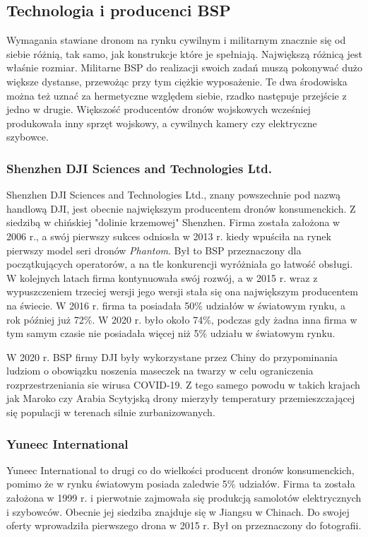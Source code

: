 \subsection{Technologia i producenci BSP}
Wymagania stawiane dronom na rynku cywilnym i militarnym znacznie się od siebie różnią, tak samo, jak konstrukcje które je spełniają. Największą różnicą jest właśnie rozmiar. Militarne BSP do realizacji swoich zadań muszą pokonywać dużo większe dystanse, przewożąc przy tym ciężkie wyposażenie. Te dwa środowiska można też uznać za hermetyczne względem siebie, rzadko następuje przejście z jedno w drugie. Większość producentów dronów wojskowych wcześniej produkowała inny sprzęt wojskowy, a cywilnych kamery czy elektryczne szybowce.

\subsubsection{Shenzhen DJI Sciences and Technologies Ltd.}
Shenzhen DJI Sciences and Technologies Ltd., znany powszechnie pod nazwą handlową DJI, jest obecnie największym producentem dronów konsumenckich. Z siedzibą w chińskiej "dolinie krzemowej" Shenzhen. Firma została założona w 2006 r., a swój pierwszy sukces odniosła w 2013 r. kiedy wpuściła na rynek pierwszy model seri dronów \textit{Phantom}. Był to BSP przeznaczony dla początkujących operatorów, a na tle konkurencji wyróżniała go łatwość obsługi. W kolejnych latach firma kontynuowała swój rozwój, a w 2015 r. wraz z wypuszczeniem trzeciej wersji jego wersji stała się ona największym producentem na świecie. W 2016 r. firma ta posiadała 50\% udziałów w światowym rynku, a rok później już 72\%. W 2020 r. było około 74\%, podczas gdy żadna inna firma w tym samym czasie nie posiadała więcej niż 5\% udziału w światowym rynku.

W 2020 r. BSP firmy DJI były wykorzystane przez Chiny do przypominania ludziom o obowiązku noszenia maseczek na twarzy w celu ograniczenia rozprzestrzeniania sie wirusa COVID-19. Z tego samego powodu w takich krajach jak Maroko czy Arabia Scytyjską drony mierzyły temperatury przemieszczającej się populacji w terenach silnie zurbanizowanych.\cite{dji-wiki}\cite{dji-market-share}

\subsubsection{Yuneec International}

Yuneec International to drugi co do wielkości producent dronów konsumenckich, pomimo że w rynku światowym posiada zaledwie 5\% udziałów. Firma ta została założona w 1999 r. i pierwotnie zajmowała się produkcją samolotów elektrycznych i szybowców. Obecnie jej siedziba znajduje się w Jiangsu w Chinach. Do swojej oferty wprowadziła pierwszego drona w 2015 r. Był on przeznaczony do fotografii. 


